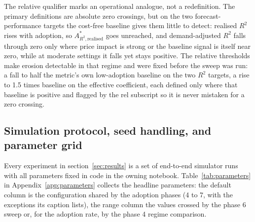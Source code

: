 \documentclass[12pt]{article}
\begin{document}
The relative qualifier marks an operational analogue, not a redefinition. The primary definitions are absolute zero crossings, but on the two forecast-performance targets the cost-free baseline gives them little to detect: realised $R^{2}$ rises with adoption, so $A^{*}_{R^{2},\mathrm{realised}}$ goes unreached, and demand-adjusted $R^{2}$ falls through zero only where price impact is strong or the baseline signal is itself near zero, while at moderate settings it falls yet stays positive. %
The relative thresholds make erosion detectable in that regime and were fixed before the sweep was run: a fall to half the metric's own low-adoption baseline on the two $R^{2}$ targets, a rise to 1.5 times baseline on the effective coefficient, each defined only where that baseline is positive and flagged by the rel subscript so it is never mistaken for a zero crossing. %

\subsection{Simulation protocol, seed handling, and parameter grid}\label{sec:metrics-protocol}

Every experiment in section~\ref{sec:results} is a set of end-to-end simulator runs with all parameters fixed in code in the owning notebook. Table~\ref{tab:parameters} in Appendix~\ref{app:parameters} collects the headline parameters: the default column is the configuration shared by the adoption phases (4 to 7, with the exceptions its caption lists), the range column the values crossed by the phase 6 sweep or, for the adoption rate, by the phase 4 regime comparison. %
\end{document}
